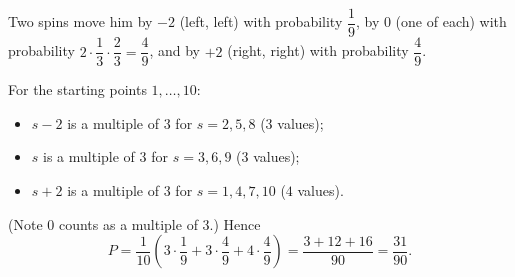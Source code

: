 Two spins move him by $-2$ (left, left) with probability $\dfrac{1}{9}$, by $0$ (one of each) with probability $2\cdot\dfrac{1}{3}\cdot\dfrac{2}{3}=\dfrac{4}{9}$, and by $+2$ (right, right) with probability $\dfrac{4}{9}$.

For the starting points $1,\dots,10$:
\begin{itemize}
\item $s-2$ is a multiple of $3$ for $s=2,5,8$ ($3$ values);
\item $s$ is a multiple of $3$ for $s=3,6,9$ ($3$ values);
\item $s+2$ is a multiple of $3$ for $s=1,4,7,10$ ($4$ values).
\end{itemize}
(Note $0$ counts as a multiple of $3$.) Hence
\[
P=\dfrac{1}{10}\left(3\cdot\dfrac{1}{9}+3\cdot\dfrac{4}{9}+4\cdot\dfrac{4}{9}\right)=\dfrac{3+12+16}{90}=\boxed{\dfrac{31}{90}}.
\]
